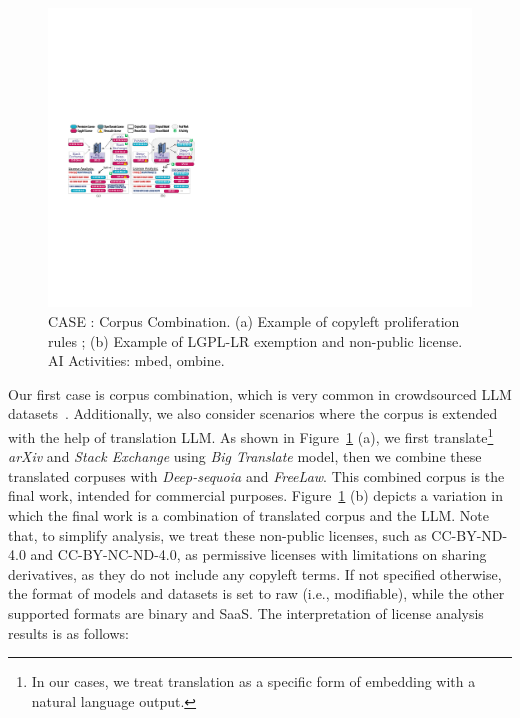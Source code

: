 \begin{figure}[h]
    \centering
    \includegraphics[width=\linewidth]{fig/case1.pdf}
    \caption{CASE : Corpus Combination. (a) Example of copyleft proliferation rules ; (b) Example of LGPL-LR exemption and non-public license. AI Activities: mbed, ombine.}
    \Description{}
    \label{fig:case1}
\end{figure}

Our first case is corpus combination, which is very common in crowdsourced LLM datasets~\cite{gao2020the, penedo2023refinedweb, kocetkov2023stack}. 
Additionally, we also consider scenarios where the corpus is extended with the help of translation LLM.
As shown in Figure~\ref{fig:case1} (a), we first translate\footnote{In our cases, we treat translation as a specific form of embedding with a natural language output.} \textit{arXiv} and \textit{Stack Exchange} using \textit{Big Translate} model, then we combine these translated corpuses with \textit{Deep-sequoia} and \textit{FreeLaw}.
This combined corpus is the final work, intended for commercial purposes.
Figure~\ref{fig:case1} (b) depicts a variation in which the final work is a combination of translated corpus and the LLM.
Note that, to simplify analysis, we treat these non-public licenses, such as CC-BY-ND-4.0 and CC-BY-NC-ND-4.0, as permissive licenses with limitations on sharing derivatives, as they do not include any copyleft terms.
If not specified otherwise, the format of models and datasets is set to raw (i.e., modifiable), while the other supported formats are binary and SaaS.
The interpretation of license analysis results is as follows:

